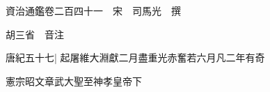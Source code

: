 






























































資治通鑑卷二百四十一　宋　司馬光　撰

胡三省　音注

唐紀五十七|{
	起屠維大淵獻二月盡重光赤奮若六月凡二年有奇}


憲宗昭文章武大聖至神孝皇帝下

